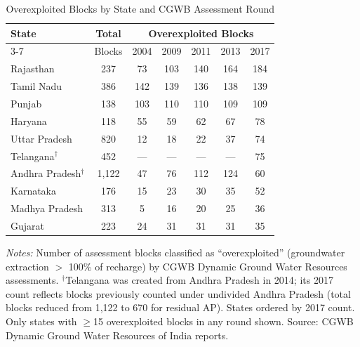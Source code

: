 \begin{table}[htbp]
\centering
\caption{Overexploited Blocks by State and CGWB Assessment Round}
\label{tab:assessment}
\begin{threeparttable}
\begin{tabular}{lcccccc}
\toprule
State & Total & \multicolumn{5}{c}{Overexploited Blocks} \\
\cmidrule(lr){3-7}
& Blocks & 2004 & 2009 & 2011 & 2013 & 2017 \\
\midrule
Rajasthan & 237 & 73 & 103 & 140 & 164 & 184 \\
Tamil Nadu & 386 & 142 & 139 & 136 & 138 & 139 \\
Punjab & 138 & 103 & 110 & 110 & 109 & 109 \\
Haryana & 118 & 55 & 59 & 62 & 67 & 78 \\
Uttar Pradesh & 820 & 12 & 18 & 22 & 37 & 74 \\
Telangana$^\dagger$ & 452 & --- & --- & --- & --- & 75 \\
Andhra Pradesh$^\dagger$ & 1,122 & 47 & 76 & 112 & 124 & 60 \\
Karnataka & 176 & 15 & 23 & 30 & 35 & 52 \\
Madhya Pradesh & 313 & 5 & 16 & 20 & 25 & 36 \\
Gujarat & 223 & 24 & 31 & 31 & 31 & 35 \\
\bottomrule
\end{tabular}
\begin{tablenotes}[flushleft]
\small
\item \textit{Notes:} Number of assessment blocks classified as
``overexploited'' (groundwater extraction $>$ 100\% of recharge) by CGWB
Dynamic Ground Water Resources assessments. $^\dagger$Telangana was created from
Andhra Pradesh in 2014; its 2017 count reflects blocks previously counted
under undivided Andhra Pradesh (total blocks reduced from 1,122 to 670 for
residual AP). States ordered by 2017 count. Only states with $\geq$15
overexploited blocks in any round shown.
Source: CGWB Dynamic Ground Water Resources of India reports.
\end{tablenotes}
\end{threeparttable}
\end{table}
